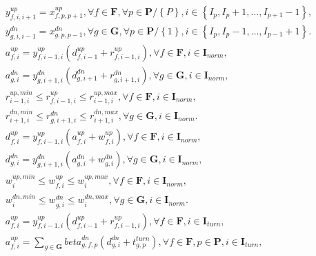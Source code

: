 \begin{align}
  & y_{f , i , i + 1}^{up} = x_{f , p , p + 1}^{up} , \forall f \in \mathbf{F} , \forall p \in \mathbf{P} / \left\{P\right\} , i \in \left\{I_{p} , I_{p} + 1 , \ldots , I_{p + 1} - 1\right\} , \tag{eq\_0002} \\
  & y_{g , i , i - 1}^{dn} = x_{g , p , p - 1}^{dn} , \forall g \in \mathbf{G} , \forall p \in \mathbf{P} / \left\{1\right\} , i \in \left\{I_{p} , I_{p} - 1 , \ldots , I_{p - 1} + 1\right\} . \tag{eq\_0003} \\
  & a_{f , i}^{up} = y_{f , i - 1 , i}^{up} \left(d_{f , i - 1}^{up} + r_{f , i - 1 , i}^{up}\right) , \forall f \in \mathbf{F} , i \in \mathbf{I}_{norm} , \tag{eq\_0005} \\
  & a_{g , i}^{dn} = y_{g , i + 1 , i}^{dn} \left(d_{g , i + 1}^{dn} + r_{g , i + 1 , i}^{dn}\right) , \forall g \in \mathbf{G} , i \in \mathbf{I}_{norm} , \tag{eq\_0006} \\
  & r_{i - 1 , i}^{up , min} \leq r_{f , i - 1 , i}^{up} \leq r_{i - 1 , i}^{up , max} , \forall f \in \mathbf{F} , i \in \mathbf{I}_{norm} , \tag{eq\_0008} \\
  & r_{i + 1 , i}^{dn , min} \leq r_{g , i + 1 , i}^{dn} \leq r_{i + 1 , i}^{dn , max} , \forall g \in \mathbf{G} , i \in \mathbf{I}_{norm} . \tag{eq\_0009} \\
  & d_{f , i}^{up} = y_{f , i - 1 , i}^{up} \left(a_{f , i}^{up} + w_{f , i}^{up}\right) , \forall f \in \mathbf{F} , i \in \mathbf{I}_{norm} , \tag{eq\_0011} \\
  & d_{g , i}^{dn} = y_{g , i + 1 , i}^{dn} \left(a_{g , i}^{dn} + w_{g , i}^{dn}\right) , \forall g \in \mathbf{G} , i \in \mathbf{I}_{norm} , \tag{eq\_0012} \\
  & w_{i}^{up , min} \leq w_{f , i}^{up} \leq w_{i}^{up , max} , \forall f \in \mathbf{F} , i \in \mathbf{I}_{norm} , \tag{eq\_0014} \\
  & w_{i}^{dn , min} \leq w_{g , i}^{dn} \leq w_{i}^{dn , max} , \forall g \in \mathbf{G} , i \in \mathbf{I}_{norm} . \tag{eq\_0015} \\
  & a_{f , i}^{up} = y_{f , i - 1 , i}^{up} \left(d_{f , i - 1}^{up} + r_{f , i - 1 , i}^{up}\right) , \forall f \in \mathbf{F} , i \in \mathbf{I}_{turn} , \tag{eq\_0016} \\
  & a_{f , i}^{up} = \sum_{g \in \mathbf{G}} \mathit{beta}_{g , f , p}^{dn} \left(d_{g , i}^{dn} + t_{g , p}^{turn}\right) , \forall f \in \mathbf{F} , p \in \mathbf{P} , i \in \mathbf{I}_{turn} , \tag{eq\_0017} \\

\end{align}
